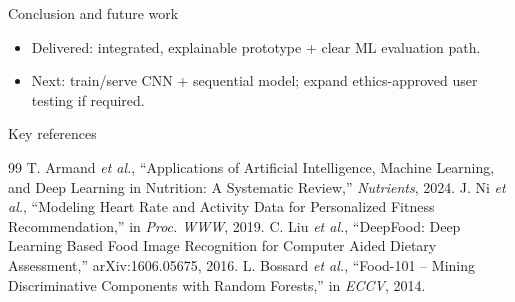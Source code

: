 \documentclass[aspectratio=169,11pt]{beamer}
\begin{document}
\begin{frame}{Conclusion and future work}
  \begin{itemize}
    \item Delivered: integrated, explainable prototype + clear ML evaluation path.
    \item Next: train/serve CNN + sequential model; expand ethics-approved user testing if required.
  \end{itemize}
\end{frame}

\begin{frame}[allowframebreaks]{Key references}
  \tiny
  \begin{thebibliography}{99}
   T. Armand \emph{et al.}, ``Applications of Artificial Intelligence, Machine Learning, and Deep Learning in Nutrition: A Systematic Review,'' \emph{Nutrients}, 2024.
   J. Ni \emph{et al.}, ``Modeling Heart Rate and Activity Data for Personalized Fitness Recommendation,'' in \emph{Proc. WWW}, 2019.
   C. Liu \emph{et al.}, ``DeepFood: Deep Learning Based Food Image Recognition for Computer Aided Dietary Assessment,'' arXiv:1606.05675, 2016.
   L. Bossard \emph{et al.}, ``Food-101 -- Mining Discriminative Components with Random Forests,'' in \emph{ECCV}, 2014.
  \end{thebibliography}
\end{frame}
\end{document}
